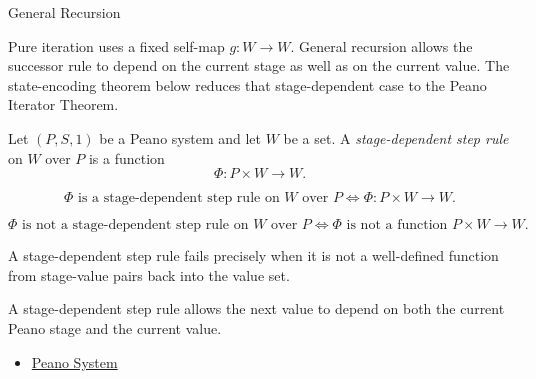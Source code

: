 \begin{topicbox}{General Recursion}
\begin{exposition}
Pure iteration uses a fixed self-map $g:W\to W$. General recursion allows the
successor rule to depend on the current stage as well as on the current value.
The state-encoding theorem below reduces that stage-dependent case to the
Peano Iterator Theorem.
\end{exposition}

\begin{tcolorbox}[colback=defbox, colframe=defborder, arc=2pt,
  left=6pt, right=6pt, top=4pt, bottom=4pt,
  title={\small\textbf{Definition (Stage-Dependent Step Rule)}},
  fonttitle=\small\bfseries]
\begin{definition}
\label{def:stage-dependent-step-rule}
Let $(P,S,1)$ be a Peano system and let $W$ be a set. A
\emph{stage-dependent step rule} on $W$ over $P$ is a function
\[
\Phi:P\times W\to W.
\]
\end{definition}
\end{tcolorbox}

\begin{remark*}
\[
\Phi \text{ is a stage-dependent step rule on } W \text{ over } P
\Longleftrightarrow
\Phi:P\times W\to W.
\]
\end{remark*}


\begin{remark*}
\[
\Phi \text{ is not a stage-dependent step rule on } W \text{ over } P
\Longleftrightarrow
\Phi \text{ is not a function } P\times W\to W.
\]
\end{remark*}

\begin{remark*}
A stage-dependent step rule fails precisely when it is not a well-defined
function from stage-value pairs back into the value set.
\end{remark*}

\begin{remark*}[Interpretation]
A stage-dependent step rule allows the next value to depend on both the
current Peano stage and the current value.
\end{remark*}

\begin{remark*}[Dependencies]
\begin{itemize}
  \item \hyperref[def:peano-system]{Peano System}
\end{itemize}
\end{remark*}


\end{topicbox}
